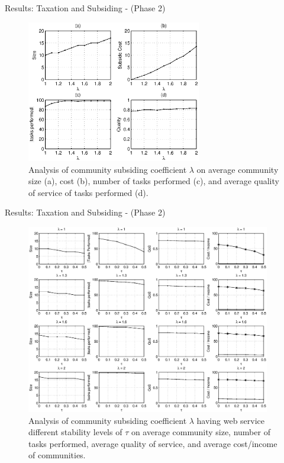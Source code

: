 \documentclass{beamer}
\begin{document}
\begin{frame}{Results: Taxation and Subsiding - (Phase 2)}
    \begin{figure}[!t]
        \centering
        \includegraphics[width=3in]{figures/taxtation.eps}
        \caption{Analysis of community subsiding coefficient $\lambda$ on
        average community size (a), cost (b), number of tasks performed
        (c), and average quality of service of tasks performed (d).}
        \label{f_taxtation}
    \end{figure}
\end{frame}

\begin{frame}{Results: Taxation and Subsiding - (Phase 2)}
    \begin{figure}[!t]
        \centerline{\includegraphics[width=4.2in]{figures/tax_dyn.eps}}
        \caption{Analysis of community subsiding coefficient $\lambda$
        having web service different stability levels of $\tau$ on average
        community size, number of tasks performed, average quality of
        service, and average cost/income of communities.}
        \label{fig_dynamic_taxtation}
    \end{figure}
\end{frame}
\end{document}
